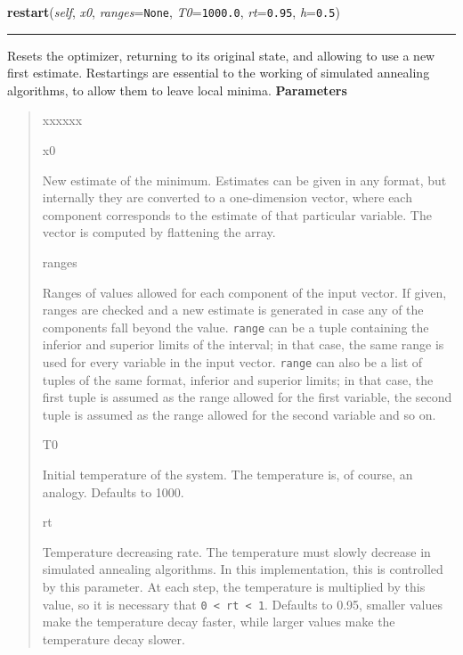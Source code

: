 \hspace{.8\funcindent}\begin{boxedminipage}{\funcwidth}

    \raggedright \textbf{restart}(\textit{self}, \textit{x0}, \textit{ranges}={\tt None}, \textit{T0}={\tt 1000.0}, \textit{rt}={\tt 0.95}, \textit{h}={\tt 0.5})

    \vspace{-1.5ex}

    \rule{\textwidth}{0.5\fboxrule}
\setlength{\parskip}{2ex}

Resets the optimizer, returning to its original state, and allowing to
use a new first estimate. Restartings are essential to the working of
simulated annealing algorithms, to allow them to leave local minima.
\setlength{\parskip}{1ex}
      \textbf{Parameters}
      \vspace{-1ex}

      \begin{quote}
        \begin{Ventry}{xxxxxx}

          \item[x0]


New estimate of the minimum. Estimates can be given in any format,
but internally they are converted to a one-dimension vector, where
each component corresponds to the estimate of that particular
variable. The vector is computed by flattening the array.
          \item[ranges]


Ranges of values allowed for each component of the input vector. If
given, ranges are checked and a new estimate is generated in case
any of the components fall beyond the value. \texttt{range} can be a
tuple containing the inferior and superior limits of the interval;
in that case, the same range is used for every variable in the input
vector. \texttt{range} can also be a list of tuples of the same format,
inferior and superior limits; in that case, the first tuple is
assumed as the range allowed for the first variable, the second
tuple is assumed as the range allowed for the second variable and so
on.
          \item[T0]


Initial temperature of the system. The temperature is, of course, an
analogy. Defaults to 1000.
          \item[rt]


Temperature decreasing rate. The temperature must slowly decrease in
simulated annealing algorithms. In this implementation, this is
controlled by this parameter. At each step, the temperature is
multiplied by this value, so it is necessary that \texttt{0 < rt < 1}.
Defaults to 0.95, smaller values make the temperature decay faster,
while larger values make the temperature decay slower.
        \end{Ventry}

      \end{quote}

    \end{boxedminipage}

